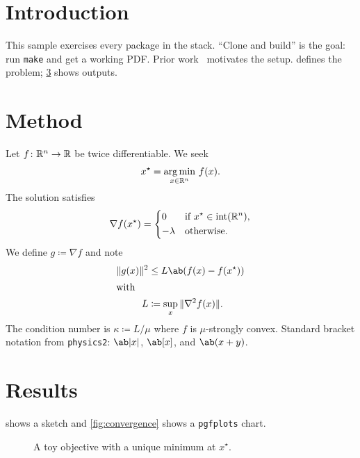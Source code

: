 \section{Introduction}
\label{sec:intro}

This sample exercises every package in the stack.
\enquote{Clone and build} is the goal: run \texttt{make} and get a working PDF\@.
Prior work~\autocite{example2024} motivates the setup.
 defines the problem; \cref{sec:results} shows outputs.

\section{Method}
\label{sec:method}

Let $f \colon \mathbb{R}^n \to \mathbb{R}$ be twice differentiable.
We seek
%
\begin{equation}
  \label{eq:argmin}
  x^\star = \operatorname*{arg\,min}_{x \in \mathbb{R}^n}\, f(x).
\end{equation}
%
The solution satisfies
%
\begin{equation}
  \label{eq:cases}
  \nabla f(x^\star) =
  \begin{dcases}
    0        & \text{if } x^\star \in \operatorname{int}(\mathbb{R}^n), \\
    -\lambda & \text{otherwise.}
  \end{dcases}
\end{equation}
%
We define $g \coloneqq \nabla f$ and note
%
\begin{align}
  \|g(x)\|^2 & \leq L \ab(f(x) - f(x^\star)) \label{eq:gradient-bound} \\
  \shortintertext{with}
  L          & \coloneqq \sup_{x} \|\nabla^2 f(x)\|.
  \notag
\end{align}
%
The condition number is $\kappa \coloneqq L / \mu$ where $f$ is $\mu$-strongly convex.
Standard bracket notation from \texttt{physics2}: $\ab|x|$, $\ab[x]$, and $\ab(x + y)$.

\section{Results}
\label{sec:results}

 shows a \TikZ{} sketch and \cref{fig:convergence} shows a \texttt{pgfplots} chart.

\begin{figure}[h]
  \centering
  \caption{A toy objective with a unique minimum at $x^\star$.}
  \label{fig:objective}
\end{figure}

